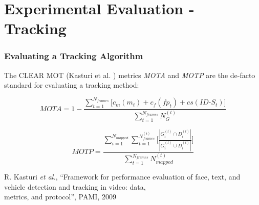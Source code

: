 \section{Experimental Evaluation - Tracking}


\begin{frame}
	\frametitle{Evaluating a Tracking Algorithm}
	
	\Large
	
	\vspace{0.45cm}
	
	The CLEAR MOT (Kasturi et al. \cite{Kasturi09}) metrics \emph{MOTA} and \emph{MOTP} are the
	de-facto standard for evaluating a tracking method:
	
	\vspace{-0.5cm}
	
	\begin{equation*}
		MOTA = 1 - \frac{\sum_{t=1}^{N_{frames}} \big [ c_m(m_t) + c_f(fp_t) + cs(ID\mbox{-}S_t) \big ]}{\sum_{t=1}^{N_{frames}} N_G^{(t)}}
	\end{equation*}
	
	\vspace{0.4cm}
	
	\begin{equation*}
		MOTP = \frac{\sum_{i=1}^{N_{mapped}} \sum_{t=1}^{N_{frames}^{(t)}} \Big [ \frac{| G_i^{(t)} \cap D_i^{(t)} |}{| G_i^{(t)} \cup D_i^{(t)} |} \Big ] }{\sum_{t=1}^{N_{frames}} N_{mapped}^{(t)}}
	\end{equation*}
	
	\vspace{0.3cm}
	
	\tiny
	
	\cite{Kasturi09} R. Kasturi \emph{et al.},  ``Framework for performance evaluation of face, text,
	and vehicle detection and tracking in video: data,\\ \hspace{0.25cm} metrics, and protocol'', PAMI,
	2009 \\
\end{frame}


